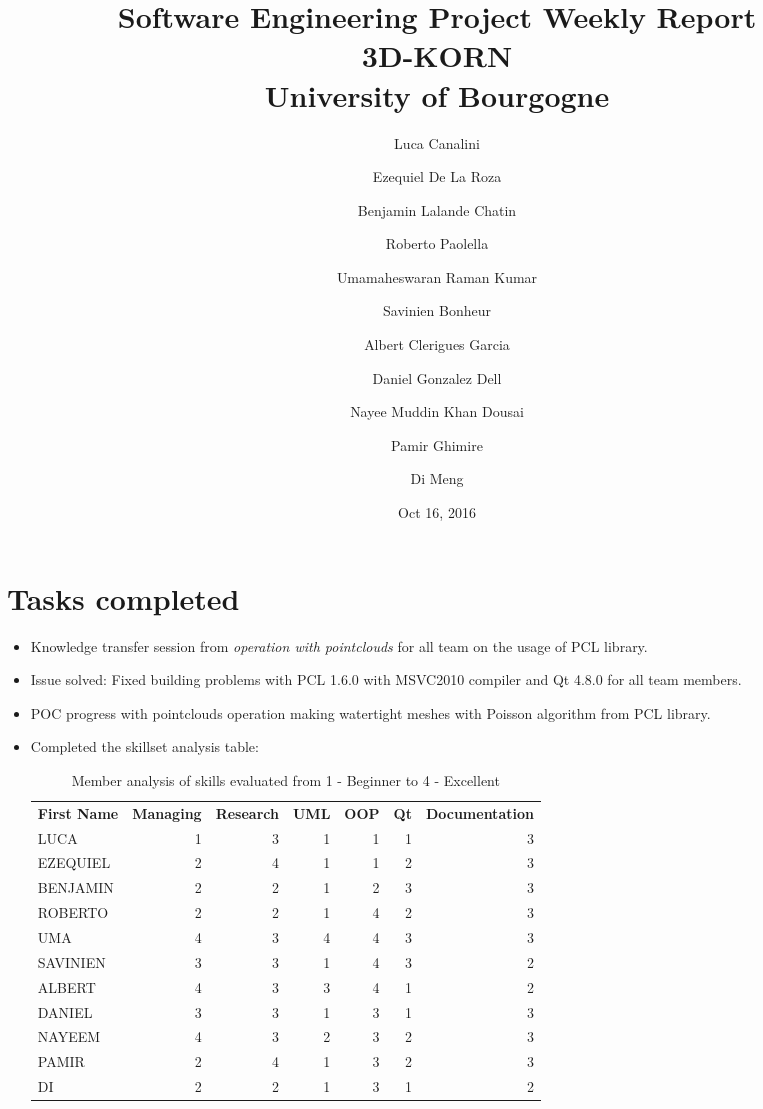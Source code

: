 \documentclass[11pt]{article} %
\title{Software Engineering Project Weekly Report\\ \textbf{3D-KORN} \\ University of Bourgogne}
\author{Luca Canalini \and Ezequiel De La Roza \and Benjamin Lalande Chatin \and Roberto Paolella \and Umamaheswaran Raman Kumar \and Savinien Bonheur \and Albert Clerigues Garcia \and Daniel Gonzalez Dell \and Nayee Muddin Khan Dousai \and Pamir Ghimire \and Di Meng
}
\date{Oct 16, 2016} %
\begin{document}
\maketitle
\newpage

\section{Tasks completed}
\begin{itemize}
	\item Knowledge transfer session from \emph{operation with pointclouds} for all team on the usage of PCL library.
	
	\item Issue solved: Fixed building problems	with PCL 1.6.0 with MSVC2010 compiler and Qt 4.8.0 for all team members.
	
	\item POC progress with pointclouds operation making watertight meshes with Poisson algorithm from PCL library.
	
	\item Completed the skillset analysis table:
\begin{table}[h]
	\centering
	\label{my-label}
	\begin{tabular}{lrrrrrr}
		\textbf{First Name}   & \textbf{Managing} & \textbf{Research} & \textbf{UML} & \textbf{OOP} & \textbf{Qt} & \textbf{Documentation} \\
		LUCA       & 1                  & 3        & 1   & 1   & 1         & 3             \\
		EZEQUIEL   & 2                  & 4        & 1   & 1   & 2         & 3             \\
		BENJAMIN   & 2                  & 2        & 1   & 2   & 3         & 3             \\
		ROBERTO    & 2                  & 2        & 1   & 4   & 2         & 3             \\
		UMA        & 4                  & 3        & 4   & 4   & 3         & 3             \\
		SAVINIEN   & 3                  & 3        & 1   & 4   & 3         & 2             \\
		ALBERT     & 4                  & 3        & 3   & 4   & 1         & 2             \\
		DANIEL     & 3                  & 3        & 1   & 3   & 1         & 3             \\
		NAYEEM     & 4                  & 3        & 2   & 3   & 2         & 3             \\
		PAMIR      & 2                  & 4        & 1   & 3   & 2         & 3             \\
		DI         & 2                  & 2        & 1   & 3   & 1         & 2                    
	\end{tabular}
\caption{Member analysis of skills evaluated from 1 - Beginner to 4 - Excellent}
\end{table}
	

\end{itemize}
\end{document}
